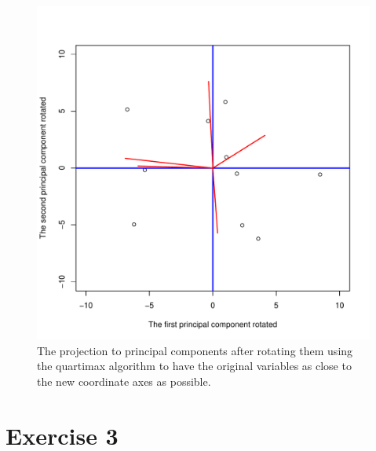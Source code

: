 \documentclass{article}
\begin{document}
\begin{figure}\centering
	\includegraphics[scale=\sscale]{qmax}
	\caption{The projection to principal components after rotating them using the quartimax algorithm to have the original variables as close to the new coordinate axes as possible.}\label{fig:qmax}
\end{figure}

\section{Exercise 3}
\subsection{}
\subsection{}
\subsection{}
\subsection{}
\end{document}
